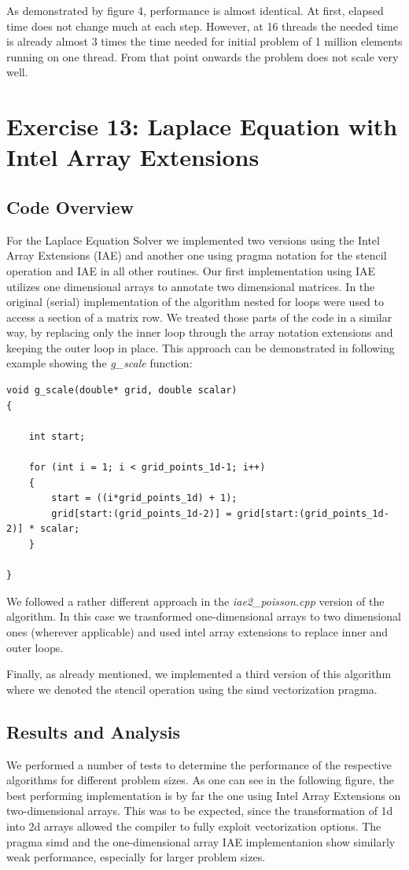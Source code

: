 \documentclass[]{scrartcl}
\begin{document}
As demonstrated by figure 4, performance is almost identical. At first, elapsed time does not change much at each step. However, at 16 threads the needed time is already almost 3 times the time needed for initial problem of 1 million elements running on one thread. From that point onwards the problem does not scale very well.

\pagebreak
\section{Exercise 13: Laplace Equation with Intel Array Extensions}

\subsection{Code Overview}
For the Laplace Equation Solver we implemented two versions using the Intel Array Extensions (IAE) and another one using pragma notation for the stencil operation and IAE in all other routines.
Our first implementation using IAE utilizes one dimensional arrays to annotate two dimensional matrices. In the original (serial) implementation of the algorithm nested for loops were used to access a section of a matrix row. We treated those parts of the code in a similar way, by replacing only the inner loop through the array notation extensions and keeping the outer loop in place.
This approach can be demonstrated in following example showing the \textit{g\_scale} function:

\begin{lstlisting}
void g_scale(double* grid, double scalar)
{
	
	int start;
		
	for (int i = 1; i < grid_points_1d-1; i++)
	{
		start = ((i*grid_points_1d) + 1);
		grid[start:(grid_points_1d-2)] = grid[start:(grid_points_1d-2)] * scalar;
	}
	
}
\end{lstlisting}

We followed a rather different approach in the \textit{iae2\_poisson.cpp} version of the algorithm. In this case we trasnformed one-dimensional arrays to two dimensional ones (wherever applicable) and used intel array extensions to replace inner and outer loops.

Finally, as already mentioned, we implemented a third version of this algorithm where we denoted the stencil operation using the simd vectorization pragma.  

\subsection{Results and Analysis}
We performed a number of tests to determine the performance of the respective algorithms for different problem sizes. As one can see in the following figure, the best performing implementation is by far the one using Intel Array Extensions on two-dimensional arrays. This was to be expected, since the transformation of 1d into 2d arrays allowed the compiler to fully exploit vectorization options. The pragma simd and the one-dimensional array IAE implementanion show similarly weak performance, especially for larger problem sizes.
\end{document}
